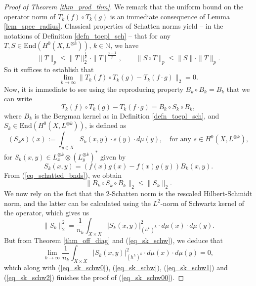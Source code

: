 \documentclass[12pt]{article}
\numberwithin{equation}{section}
\theoremstyle{theorem}
\theoremstyle{definition}
\theoremstyle{remark}
\newcommand{\nat}{\mathbb{N}}
\newcommand{\enmr}[1]{\text{End}{(#1)}}
\begin{document}
	\begin{proof}[Proof of Theorem \ref{thm_prod_thm}]
		We remark that the uniform bound on the operator norm of $T_k(f) \circ T_k(g)$ is an immediate consequence of Lemma \ref{lem_spec_radius}.
		Classical properties of Schatten norms yield -- in the notations of Definition \ref{defn_toepl_sch} -- that for any $T, S \in {\enmr{H^0(X, L^{\otimes k})}}$, $k \in \nat$, we have
		\begin{equation}\label{eq_schatted_bnds}
			\| T \|_p \leq \| T \|_2^{\frac{1}{p}} \cdot  \| T \|^{\frac{p - 1}{p}}, \qquad \| S \circ T \|_p \leq \| S \| \cdot \| T \|_p.
		\end{equation}
		So it suffices to establish that 
		\begin{equation}\label{eq_sk_schw00}
			\lim_{k \to \infty}
			\| T_k(f) \circ T_k(g) - T_k(f \cdot g) \|_2 
			=
			0.
		\end{equation}
		Now, it is immediate to see using the reproducing property $B_k \circ B_k = B_k$ that we can write
		\begin{equation}\label{eq_sk_schw0}
			T_k(f) \circ T_k(g) - T_k(f \cdot g) 
			=
			B_k \circ S_k \circ B_k,
		\end{equation}
		where $B_k$ is the Bergman kernel as in Definition \ref{defn_toepl_sch}, and $S_k \in {\enmr{H^0(X, L^{\otimes k})}}$, is defined as 
		\begin{equation}
			(S_k s)(x) := \int_{y \in X} S_k(x, y) \cdot s(y) \cdot d \mu(y), \quad \text{for any } s \in H^0(X, L^{\otimes k}),
		\end{equation}
		for $S_k(x, y) \in L^{\otimes k}_x \otimes (L^{\otimes k}_y)^*$ given by
		\begin{equation}\label{eq_sk_schw}
			S_k(x, y) = (f(x) g(x) - f(x) g(y)) B_k(x, y).
		\end{equation}
		From (\ref{eq_schatted_bnds}), we obtain
		\begin{equation}\label{eq_sk_schw1}
			\| B_k \circ S_k \circ B_k \|_2 \leq \| S_k \|_2.
		\end{equation}
		We now rely on the fact that the $2$-Schatten norm is the rescaled Hilbert-Schmidt norm, and the latter can be calculated using the $L^2$-norm of Schwartz kernel of the operator, which gives us 
		\begin{equation}\label{eq_sk_schw2}
			\| S_k \|_2^2
			=
			\frac{1}{n_k} \int_{X \times X} |S_k(x, y)|^{2}_{(h^L)^k} \cdot d \mu(x) \cdot d \mu(y).
		\end{equation}
		But from Theorem \ref{thm_off_diag} and (\ref{eq_sk_schw}), we deduce that 
		\begin{equation}
			\lim_{k \to \infty} \frac{1}{n_k} \int_{X \times X} |S_k(x, y)|^{2}_{(h^L)^k} \cdot d \mu(x) \cdot d \mu(y)
			=
			0,
		\end{equation}
		which along with (\ref{eq_sk_schw0}), (\ref{eq_sk_schw}), (\ref{eq_sk_schw1}) and (\ref{eq_sk_schw2}) finishes the proof of (\ref{eq_sk_schw00}).
	\end{proof}
\end{document}
